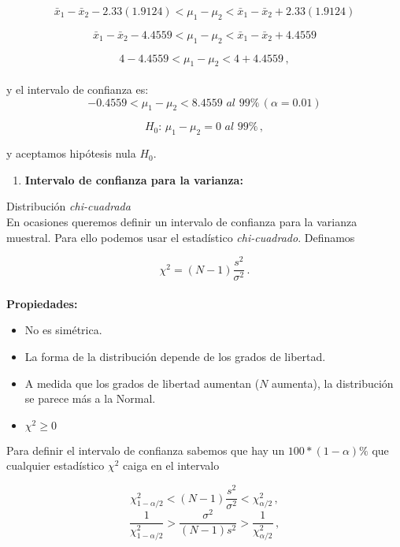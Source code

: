 \documentclass[
]{agujournal2019}
\providecommand{\tightlist}{%
  \setlength{\itemsep}{0pt}\setlength{\parskip}{0pt}}\usepackage{longtable,booktabs,array}
\begin{document}
\[\bar{x}_1-\bar{x}_2-2.33 (1.9124)<
   \mu_1-\mu_2 <
   \bar{x}_1-\bar{x}_2+2.33 (1.9124)\]

\[\bar{x}_1-\bar{x}_2-4.4559<
   \mu_1-\mu_2 <
   \bar{x}_1-\bar{x}_2+4.4559\]

\[4-4.4559<
   \mu_1-\mu_2 <
   4+4.4559\,,\]\\

y el intervalo de confianza es:\\

\[-0.4559<\mu_1-\mu_2<8.4559\,\,{ al}\,\,99\%\,(\alpha=0.01)\]

\[H_0:\,\mu_1 - \mu_2 = 0\,\,{ al}\,\,99\%\,,\]

y aceptamos hipótesis nula \(H_0\).\\

\begin{enumerate}
\def\labelenumi{(\arabic{enumi})}
\setcounter{enumi}{3}
\tightlist
\item
  \textbf{Intervalo de confianza para la varianza:}
\end{enumerate}

Distribución \emph{chi-cuadrada}\\

En ocasiones queremos definir un intervalo de confianza para la varianza
muestral. Para ello podemos usar el estadístico \emph{chi-cuadrado}.
Definamos

\[\chi^2=(N-1)\frac{s^2}{\sigma^2}\,.\]\\

\textbf{Propiedades:}

\begin{itemize}
\item No es simétrica.
\item La forma de la distribución depende de los grados de libertad.
\item A medida que los grados de libertad aumentan ($N$ aumenta),
la distribución se parece más a la Normal.
\item $\chi^2\geq0$
\end{itemize}

\vspace{0.25cm}

Para definir el intervalo de confianza sabemos que hay un
\(100*(1-\alpha)\%\) que cualquier estadístico \(\chi^2\) caiga en el
intervalo

\[\chi^2_{1-\alpha/2}<(N-1)\frac{s^2}{\sigma^2}<\chi^2_{\alpha/2}\,,\]
\[\frac{1}{\chi^2_{1-\alpha/2}}>\frac{\sigma^2}{(N-1)s^2}>\frac{1}{\chi^2_{\alpha/2}}\,,\]
\end{document}
